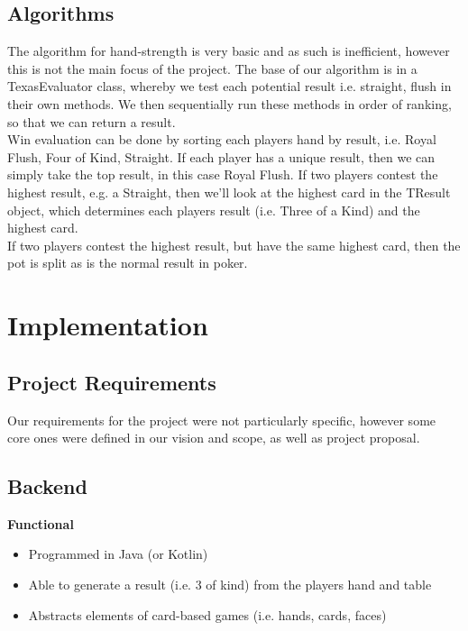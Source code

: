 \documentclass[11pt]{article}
\begin{document}
\newpage


\subsection{Algorithms}

The algorithm for hand-strength is very basic and as such is inefficient, however this is not the main focus of the project. The base of our algorithm is in a TexasEvaluator class, whereby we test each potential result i.e. straight, flush in their own methods. We then sequentially run these methods in order of ranking, so that we can return a result. \\


Win evaluation can be done by sorting each players hand by result, i.e. Royal Flush, Four of Kind, Straight. If each player has a unique result, then we can simply take the top result, in this case Royal Flush. If two players contest the highest result, e.g. a Straight, then we'll look at the highest card in the TResult object, which determines each players result (i.e. Three of a Kind) and the highest card. \\

If two players contest the highest result, but have the same highest card, then the pot is split as is the normal result in poker. 

\section{Implementation}

\subsection{Project Requirements}
Our requirements for the project were not particularly specific, however some core ones were defined in our vision and scope, as well as project proposal. 

\subsection{Backend}
\textbf{Functional}
\begin{itemize}
	\item Programmed in Java (or Kotlin)
	\item Able to generate a result (i.e. 3 of kind) from the players hand and table
	\item Abstracts elements of card-based games (i.e. hands, cards, faces)
\end{itemize}
%	
\end{document}

